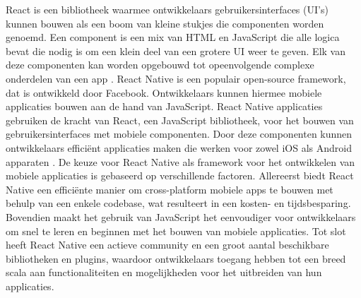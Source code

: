 React is een bibliotheek waarmee ontwikkelaars gebruikersinterfaces (UI's) kunnen bouwen als een boom van kleine stukjes die componenten worden genoemd. Een component is een mix van HTML en JavaScript die alle logica bevat die nodig is om een klein deel van een grotere UI weer te geven. Elk van deze componenten kan worden opgebouwd tot opeenvolgende complexe onderdelen van een app \autocite{Baer2018}. React Native is een populair open-source framework, dat is ontwikkeld door Facebook. Ontwikkelaars kunnen hiermee mobiele applicaties bouwen aan de hand van JavaScript. React Native applicaties gebruiken de kracht van React, een JavaScript bibliotheek, voor het bouwen van gebruikersinterfaces met mobiele componenten. Door deze componenten kunnen ontwikkelaars efficiënt applicaties maken die werken voor zowel iOS als Android apparaten \autocite{Vinnik2021}. De keuze voor React Native als framework voor het ontwikkelen van mobiele applicaties is gebaseerd op verschillende factoren. Allereerst biedt React Native een efficiënte manier om cross-platform mobiele apps te bouwen met behulp van een enkele codebase, wat resulteert in een kosten- en tijdsbesparing. Bovendien maakt het gebruik van JavaScript het eenvoudiger voor ontwikkelaars om snel te leren en beginnen met het bouwen van mobiele applicaties. Tot slot heeft React Native een actieve community en een groot aantal beschikbare bibliotheken en plugins, waardoor ontwikkelaars toegang hebben tot een breed scala aan functionaliteiten en mogelijkheden voor het uitbreiden van hun applicaties.



